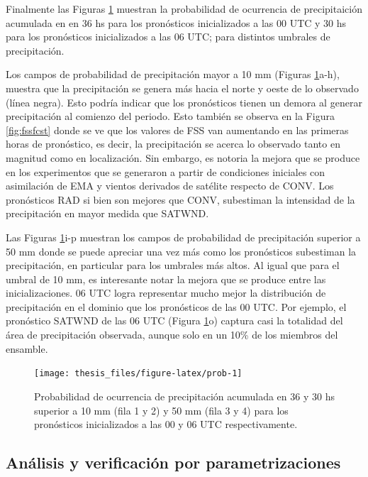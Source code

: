 \documentclass[12pt,oneside]{reedthesis}
\begin{document}
Finalmente las Figuras \ref{fig:prob} muestran la probabilidad de ocurrencia de precipitaición acumulada en en 36 hs para los pronósticos inicializados a las 00 UTC y 30 hs para los pronósticos inicializados a las 06 UTC; para distintos umbrales de precipitación.

Los campos de probabilidad de precipitación mayor a 10 mm (Figuras \ref{fig:prob}a-h), muestra que la precipitación se genera más hacia el norte y oeste de lo observado (línea negra). Esto podría indicar que los pronósticos tienen un demora al generar precipitación al comienzo del periodo. Esto también se observa en la Figura \ref{fig:fssfcst} donde se ve que los valores de FSS van aumentando en las primeras horas de pronóstico, es decir, la precipitación se acerca lo observado tanto en magnitud como en localización. Sin embargo, es notoria la mejora que se produce en los experimentos que se generaron a partir de condiciones iniciales con asimilación de EMA y vientos derivados de satélite respecto de CONV. Los pronósticos RAD si bien son mejores que CONV, subestiman la intensidad de la precipitación en mayor medida que SATWND.

Las Figuras \ref{fig:prob}i-p muestran los campos de probabilidad de precipitación superior a 50 mm donde se puede apreciar una vez más como los pronósticos subestiman la precipitación, en particular para los umbrales más altos. Al igual que para el umbral de 10 mm, es interesante notar la mejora que se produce entre las inicializaciones. 06 UTC logra representar mucho mejor la distribución de precipitación en el dominio que los pronósticos de las 00 UTC. Por ejemplo, el pronóstico SATWND de las 06 UTC (Figura \ref{fig:prob}o) captura casi la totalidad del área de precipitación observada, aunque solo en un 10\% de los miembros del ensamble.


\begin{figure}

{\centering \texttt{[image: thesis\_files/figure-latex/prob-1]} 

}

\caption{Probabilidad de ocurrencia de precipitación acumulada en 36 y 30 hs superior a 10 mm (fila 1 y 2) y 50 mm (fila 3 y 4) para los pronósticos inicializados a las 00 y 06 UTC respectivamente.}\label{fig:prob}
\end{figure}
\hypertarget{anuxe1lisis-y-verificaciuxf3n-por-parametrizaciones}{%
\subsection{Análisis y verificación por parametrizaciones}\label{anuxe1lisis-y-verificaciuxf3n-por-parametrizaciones}}
\end{document}
